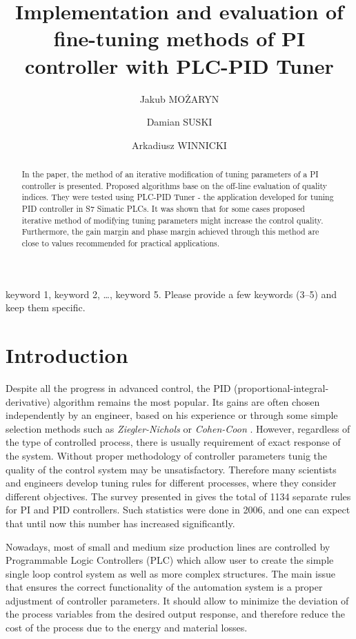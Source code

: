 \documentclass{amcs}
\title[Implemention and evaluation...]{Implementation and evaluation of fine-tuning methods of PI controller with PLC-PID Tuner}
\author[ad1][ad2]{Jakub MOŻARYN}
\author[ad1][]{Damian SUSKI}
\author[ad1][ad2]{Arkadiusz WINNICKI}
\begin{document}
\begin{abstract}
In the paper, the method of an iterative modification of tuning parameters of a PI controller is presented. Proposed algorithms base on the off-line evaluation of quality indices. They were tested using PLC-PID Tuner - the application developed for tuning PID controller in S7 Simatic PLCs. It was shown that for some cases  proposed iterative method of modifying tuning parameters might increase the control quality. Furthermore, the gain margin and phase margin achieved  through this method are close to values recommended for  practical applications.
\end{abstract}

\begin{keywords}
keyword 1, keyword 2, \dots, keyword 5. Please provide a few keywords (3--5) and keep them specific.
\end{keywords}
\maketitle

\section{Introduction}
Despite all the progress in advanced control, the PID (proportional-integral-derivative) algorithm remains the most popular. Its gains are often chosen independently by an engineer, based on his experience or through some simple selection methods such as \textit{Ziegler-Nichols} \cite{Ziegler:1942} or \textit{Cohen-Coon} \cite{Cohen:1953}. However, regardless of the type of controlled process, there is usually requirement of exact response of the system. Without proper methodology of controller parameters tunig the quality of the control system may be unsatisfactory. Therefore many scientists and engineers develop tuning rules for different processes, where they consider different objectives. The survey presented in \cite{Odwyer:2006} gives the total of 1134 separate rules for PI and PID controllers. Such statistics were done in 2006, and one can expect that until now this number has increased significantly.

Nowadays, most of small and medium size production lines are controlled by Programmable Logic Controllers (PLC) which allow user to create the simple single loop control system as well as more complex structures. The main issue that ensures the correct functionality of the automation system is a proper adjustment of controller parameters. It should allow to minimize the deviation of the process variables from the desired output response, and therefore reduce the cost of the process due to the energy and material losses. 
\end{document}
